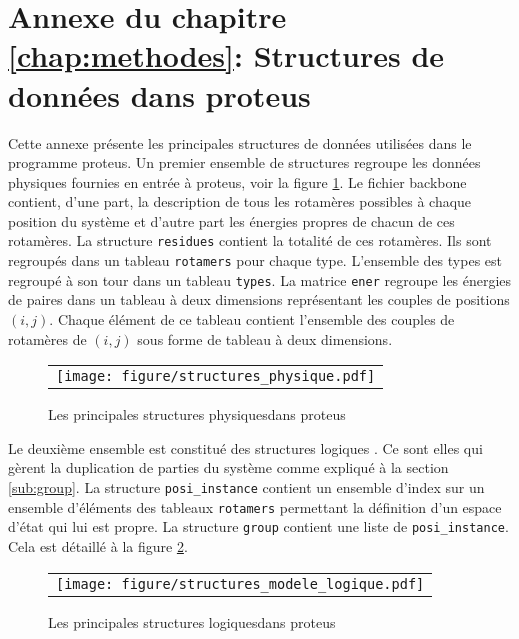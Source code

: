 \chapter*{Annexe du chapitre \ref{chap:methodes}: Structures de données dans proteus}
\label{chap:annexeproteus}

Cette annexe présente les principales structures de données utilisées dans le programme proteus. Un premier ensemble de structures regroupe les données physiques fournies en entrée à proteus, voir la figure \ref{fig:structPhy}. Le fichier backbone contient, d'une part, la description de tous les rotamères possibles à chaque position du système et d'autre part les énergies propres de chacun de ces rotamères. La structure \verb!residues! contient la totalité de ces rotamères. Ils sont regroupés dans un tableau \verb!rotamers!  pour chaque type. L'ensemble des types est regroupé à son tour dans un tableau \verb!types!. La matrice \verb!ener! regroupe les énergies de paires dans un tableau à deux dimensions représentant les couples de positions $(i,j)$. Chaque élément de ce tableau contient l'ensemble des couples de rotamères de $(i,j)$  sous forme de tableau à deux dimensions.
   \begin{figure}[!htbp]
     \centering
     \begin{tabular}{c}
       \texttt{[image: figure/structures\_physique.pdf]} 
     \end{tabular}
     
     \caption{Les principales structures \og physiques\fg  dans proteus}
\label{fig:structPhy}
   \end{figure}

Le deuxième ensemble est constitué des structures \og logiques \fg. Ce sont elles qui gèrent la duplication de parties du système comme expliqué à la section \ref{sub:group}. La structure \verb!posi_instance! contient un ensemble d'index sur un ensemble d'éléments des tableaux \verb!rotamers! permettant la définition d'un espace d'état qui lui est propre. La structure \verb!group! contient une liste de \verb!posi_instance!. Cela est détaillé à la figure  \ref{fig:structLog}.    
   \begin{figure}[!htbp]
     \centering
     \begin{tabular}{c}
       \texttt{[image: figure/structures\_modele\_logique.pdf]} 
     \end{tabular}
     
     \caption{Les principales structures \og logiques\fg  dans proteus}
\label{fig:structLog}
   \end{figure}
   
